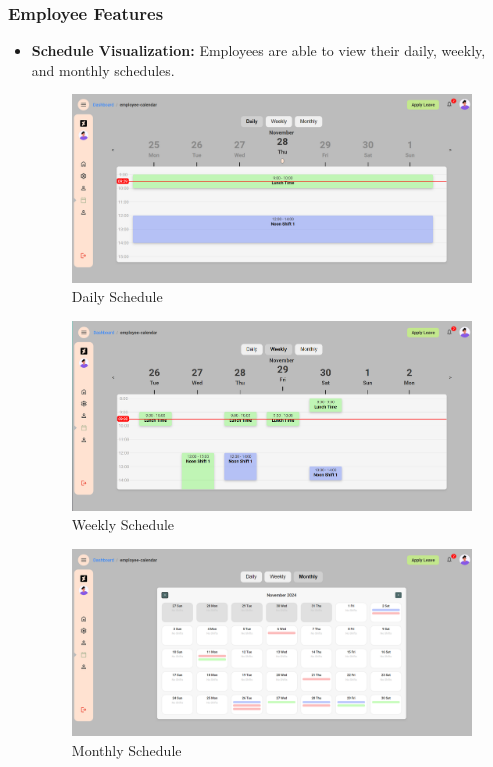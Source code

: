 \documentclass[a4paper,12pt, oneside]{report}
\begin{document}
\subsubsection{Employee Features}
    \begin{itemize}

    \item \textbf{Schedule Visualization:} Employees are able to view their daily, weekly, and monthly schedules.

    \begin{figure}[H]
    \centering
    \includegraphics[width=0.8\columnwidth]{EmployeePages/DailySchedule.png}
    \caption{Daily Schedule}
    \label{fig:employee-daily-schedule}
    \end{figure}

    \begin{figure}[H]
    \centering
    \includegraphics[width=0.8\columnwidth]{EmployeePages/WeeklySchedule.png}
    \caption{Weekly Schedule}
    \label{fig:employee-weekly-schedule}
    \end{figure}
    
    \begin{figure}[H]
    \centering
    \includegraphics[width=0.8\columnwidth]{EmployeePages/MonthlySchedule.png}
    \caption{Monthly Schedule}
    \label{fig:employee-monthly-schedule}
    \end{figure}
    

\end{itemize}
\end{document}
